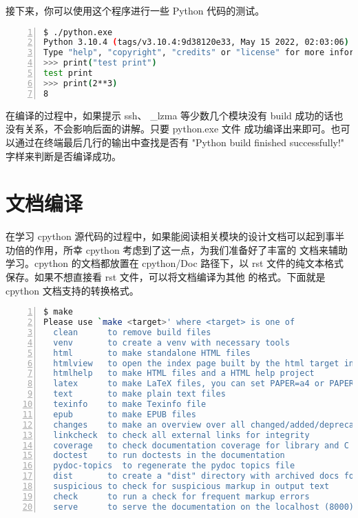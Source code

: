 接下来，你可以使用这个程序进行一些 Python 代码的测试。

\begin{lstlisting}[language=bash, numbers=left, numbersep=1em, numberstyle=\footnotesize , breaklines=true]
$ ./python.exe
Python 3.10.4 (tags/v3.10.4:9d38120e33, May 15 2022, 02:03:06) [Clang 13.0.0 (clang-1300.0.29.30)] on darwin
Type "help", "copyright", "credits" or "license" for more information.
>>> print("test print")
test print
>>> print(2**3)
8
\end{lstlisting}


\begin{definition}[编译过程中的警告] \label{def:int}
在编译的过程中，如果提示 ssh、 \_lzma 等少数几个模块没有 build 成功的话也没有关系，不会影响后面的讲解。只要 python.exe 文件
成功编译出来即可。也可以通过在终端最后几行的输出中查找是否有 "Python build finished successfully!" 字样来判断是否编译成功。
\end{definition}


\section{文档编译}

在学习 cpython 源代码的过程中，如果能阅读相关模块的设计文档可以起到事半功倍的作用，所幸 cpython 考虑到了这一点，为我们准备好了丰富的
文档来辅助学习。cpython 的文档都放置在 cpython/Doc 路径下，以 rst 文件的纯文本格式保存。如果不想直接看 rst 文件，可以将文档编译为其他
的格式。下面就是 cpython 文档支持的转换格式。

\begin{lstlisting}[language=bash, numbers=left, numbersep=1em, numberstyle=\footnotesize , breaklines=true]
$ make
Please use `make <target>' where <target> is one of
  clean      to remove build files
  venv       to create a venv with necessary tools
  html       to make standalone HTML files
  htmlview   to open the index page built by the html target in your browser
  htmlhelp   to make HTML files and a HTML help project
  latex      to make LaTeX files, you can set PAPER=a4 or PAPER=letter
  text       to make plain text files
  texinfo    to make Texinfo file
  epub       to make EPUB files
  changes    to make an overview over all changed/added/deprecated items
  linkcheck  to check all external links for integrity
  coverage   to check documentation coverage for library and C API
  doctest    to run doctests in the documentation
  pydoc-topics  to regenerate the pydoc topics file
  dist       to create a "dist" directory with archived docs for download
  suspicious to check for suspicious markup in output text
  check      to run a check for frequent markup errors
  serve      to serve the documentation on the localhost (8000)
\end{lstlisting}

